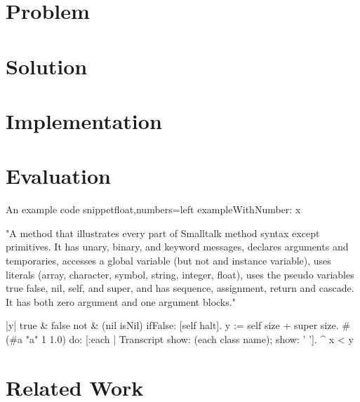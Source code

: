 \section{Problem}
\label{sec:problem}


\section{Solution}
\label{sec:solution}


\section{Implementation}
\label{sec:implementation}


\section{Evaluation}
\label{sec:evaluation}

\lstset{language=Smalltalk}
\begin{code}{An example code snippet}{float,numbers=left}
exampleWithNumber: x

"A method that illustrates every part of Smalltalk method syntax
except primitives. It has unary, binary, and keyword messages,
declares arguments and temporaries, accesses a global variable
(but not and instance variable), uses literals (array, character,
symbol, string, integer, float), uses the pseudo variables
true false, nil, self, and super, and has sequence, assignment,
return and cascade. It has both zero argument and one argument blocks."

    |y|
    true & false not & (nil isNil) ifFalse: [self halt].
    y := self size + super size.
    #(#a "a" 1 1.0)
        do: [:each | Transcript show: (each class name);
                                 show: ' '].
     ^ x < y
\end{code}


\section{Related Work}
\label{sec:related-work}

